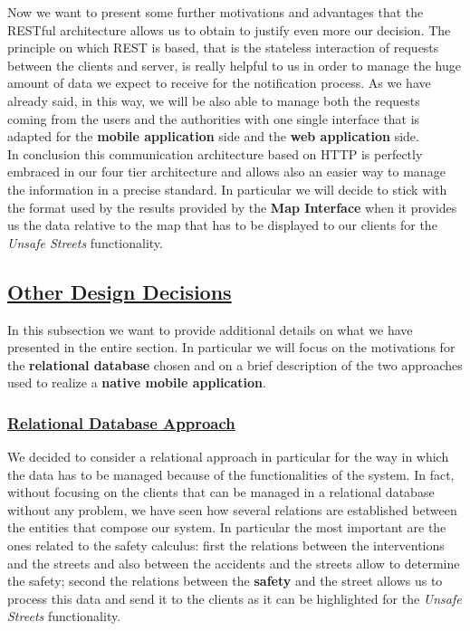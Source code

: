 			Now we want to present some further motivations and advantages that the RESTful architecture allows us to obtain to justify even more our decision. The principle on which REST is based, that is the stateless interaction of requests between the clients and server, is really helpful to us in order to manage the huge amount of data we expect to receive for the notification process. As we have already said, in this way, we will be also able to manage both the requests coming from the users and the authorities with one single interface that is adapted for the \textbf{mobile application} side and the \textbf{web application} side.\\
			
			In conclusion this communication architecture based on HTTP is perfectly embraced in our four tier architecture and allows also an easier way to manage the information in a precise standard. In particular we will decide to stick with the format used by the results provided by the \textbf{Map Interface} when it provides us the data relative to the map that has to be displayed to our clients for the \emph{Unsafe Streets} functionality.
			
		
	\subsection[Other Design Decisions]{\hyperlink{toc}{Other Design Decisions}}
		\label{sec:otherDesignDecisions}						
		
		In this subsection we want to provide additional details on what we have presented in the entire section. In particular we will focus on the motivations for the \textbf{relational database} chosen and on a brief description of the two approaches used to realize a \textbf{native mobile application}.
		
		\subsubsection[Relational Database Approach]{\hyperlink{toc}{Relational Database Approach}}
			\label{sec:relationaldbApproach}
			
			We decided to consider a relational approach in particular for the way in which the data has to be managed because of the functionalities of the system. In fact, without focusing on the clients that can be managed in a relational database without any problem, we have seen how several relations are established between the entities that compose our system. In particular the most important are the ones related to the safety calculus: first the relations between the interventions and the streets and also between the accidents and the streets allow to determine the safety; second the relations between the \textbf{safety} and the street allows us to process this data and send it to the clients as it can be highlighted for the \emph{Unsafe Streets} functionality.\\
			
